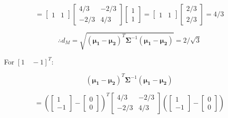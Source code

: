 \documentclass[fleqn]{article}
\begin{document}
\begin{enumerate}
\begin{enumerate}
			\begin{equation*}
				= \begin{bmatrix} 1 & 1 \end{bmatrix}\begin{bmatrix} 4/3 & -2/3 \\ -2/3 & 4/3 \end{bmatrix}\begin{bmatrix} 1 \\ 1 \end{bmatrix} = \begin{bmatrix} 1 & 1 \end{bmatrix}\begin{bmatrix} 2/3 \\ 2/3 \end{bmatrix} = 4/3
			\end{equation*}
			
			\begin{equation*}
				\therefore d_M = \sqrt{(\mathbf{\mu_1} - \mathbf{\mu_2})^T\mathbf{\Sigma}^{-1}(\mathbf{\mu_1} - \mathbf{\mu_2})} = 2/\sqrt{3}
			\end{equation*}
			
			For $[1 \quad -1]^T$:
			
			\begin{equation*}
				(\mathbf{\mu_1} - \mathbf{\mu_2})^T\mathbf{\Sigma}^{-1}(\mathbf{\mu_1} - \mathbf{\mu_2})
			\end{equation*}
			
			 \begin{equation*}
				= \left(\begin{bmatrix} 1 \\ -1 \end{bmatrix} - \begin{bmatrix} 0 \\ 0 \end{bmatrix}\right)^T\begin{bmatrix} 4/3 & -2/3 \\ -2/3 & 4/3 \end{bmatrix}\left(\begin{bmatrix} 1 \\ -1 \end{bmatrix} - \begin{bmatrix} 0 \\ 0 \end{bmatrix}\right)
			\end{equation*}
			

\end{enumerate}
\end{enumerate}
\end{document}
